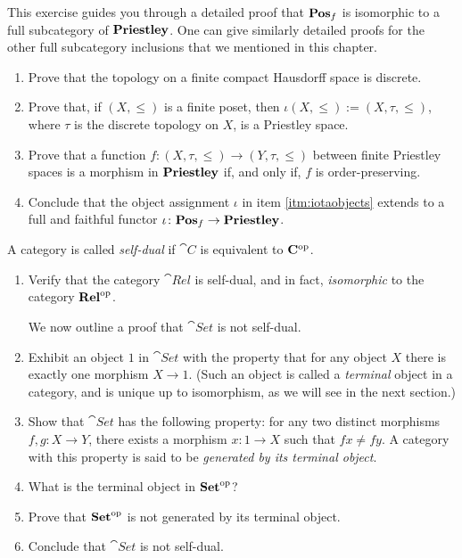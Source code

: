\exercises

\begin{exercise}\label{exe:fullsubcats}
This exercise guides you through a detailed proof that $\mathbf{Pos}_{f}$ is isomorphic to a full subcategory of $\mathbf{Priestley}$. One can give similarly detailed proofs for the other full subcategory inclusions that we mentioned in this chapter. %
\begin{enumerate}
\item Prove that the topology on a finite compact Hausdorff space is discrete.
\item\label{itm:iotaobjects} Prove that, if $(X,\leq)$ is a finite poset, then $\iota(X,\leq) := (X,\tau,\leq)$, where $\tau$ is the discrete topology on $X$, is a Priestley space.
\item Prove that a function $f \colon (X,\tau,\leq) \to (Y,\tau,\leq)$ between finite Priestley spaces is a morphism in $\mathbf{Priestley}$ if, and only if, $f$ is order-preserving.
\item Conclude that the object assignment $\iota$ in item \ref{itm:iotaobjects} extends to a full and faithful functor $\iota \colon \mathbf{Pos}_{f} \to \mathbf{Priestley}$.
\end{enumerate}
\end{exercise}


\begin{exercise}\label{exe:self-dual}
  A category is called \emph{self-dual} if $\cat{C}$ is equivalent to $\mathbf{C}^{\mathrm{op}}$.
  \begin{enumerate}
  \item \label{ite:rel-relop} Verify that the category $\cat{Rel}$ is self-dual, and in fact, \emph{isomorphic} to the category $\mathbf{Rel}^{\mathrm{op}}$.

    We now outline a proof that $\cat{Set}$ is not self-dual.
  \item Exhibit an object $1$ in $\cat{Set}$ with the property that for any object $X$ there is exactly one morphism $X \to 1$. (Such an object is called a \emph{terminal} object in a category, and is unique up to isomorphism, as we will see in the next section.)

  \item Show that $\cat{Set}$ has the following property: for any two distinct morphisms $f, g \colon X \to Y$, there exists a morphism $x \colon 1 \to X$ such that $fx \neq fy$. A category with this property is said to be \emph{generated by its terminal object}.

  \item What is the terminal object in $\mathbf{Set}^{\mathrm{op}}$?

  \item Prove that $\mathbf{Set}^{\mathrm{op}}$ is not generated by its terminal object.

  \item  Conclude that $\cat{Set}$ is not self-dual.
    \end{enumerate}
  \end{exercise}

